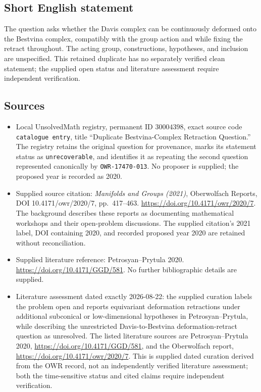 \documentclass[11pt]{article}
\begin{document}
\subsection{Short English statement}
The question asks whether the Davis complex can be continuously deformed onto the Bestvina complex, compatibly with the group action and while fixing the retract throughout. The acting group, constructions, hypotheses, and inclusion are unspecified. This retained duplicate has no separately verified clean statement; the supplied open status and literature assessment require independent verification.
\subsection{Sources}
\begin{itemize}
\item Local UnsolvedMath registry, permanent ID \(30004398\), exact source code \texttt{catalogue entry}, title ``Duplicate Bestvina-Complex Retraction Question.'' The registry retains the original question for provenance, marks its statement status as \texttt{unrecoverable}, and identifies it as repeating the second question represented canonically by \texttt{OWR-17470-013}. No proposer is supplied; the proposed year is recorded as 2020.
\item Supplied source citation: \emph{Manifolds and Groups (2021)}, Oberwolfach Reports, DOI 10.4171/owr/2020/7, pp.\ 417--463. \url{https://doi.org/10.4171/owr/2020/7}. The background describes these reports as documenting mathematical workshops and their open-problem discussions. The supplied citation's 2021 label, DOI containing 2020, and recorded proposed year 2020 are retained without reconciliation.
\item Supplied literature reference: Petrosyan--Prytula 2020. \url{https://doi.org/10.4171/GGD/581}. No further bibliographic details are supplied.
\item Literature assessment dated exactly 2026-08-22: the supplied curation labels the problem open and reports equivariant deformation retractions under additional subconical or low-dimensional hypotheses in Petrosyan--Prytula, while describing the unrestricted Davis-to-Bestvina deformation-retract question as unresolved. The listed literature sources are Petrosyan--Prytula 2020, \url{https://doi.org/10.4171/GGD/581}, and the Oberwolfach report, \url{https://doi.org/10.4171/owr/2020/7}. This is supplied dated curation derived from the OWR record, not an independently verified literature assessment; both the time-sensitive status and cited claims require independent verification.
\end{itemize}
\end{document}
